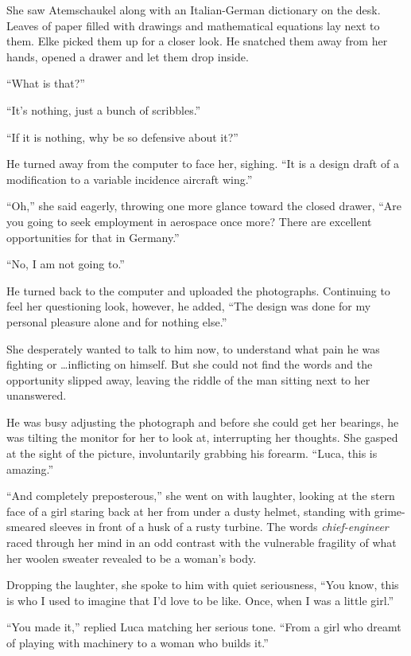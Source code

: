 She saw Atemschaukel along with an Italian-German dictionary on the desk. Leaves of paper filled with drawings and mathematical equations lay next to them. Elke picked them up for a closer look. He snatched them away from her hands, opened a drawer and let them drop inside.

``What is that?''

``It's nothing, just a bunch of scribbles.''

``If it is nothing, why be so defensive about it?''

He turned away from the computer to face her, sighing. ``It is a design draft of a modification to a variable incidence aircraft wing.''

``Oh,'' she said eagerly, throwing one more glance toward the closed drawer, ``Are you going to seek employment in aerospace once more? There are excellent opportunities for that in Germany.''

``No, I am not going to.''

He turned back to the computer and uploaded the photographs. Continuing to feel her questioning look, however, he added, ``The design was done for my personal pleasure alone and for nothing else.''

She desperately wanted to talk to him now, to understand what pain he was fighting or \ldots inflicting on himself. But she could not find the words and the opportunity slipped away, leaving the riddle of the man sitting next to her unanswered.

He was busy adjusting the photograph and before she could get her bearings, he was tilting the monitor for her to look at, interrupting her thoughts. She gasped at the sight of the picture, involuntarily grabbing his forearm. ``Luca, this is amazing.''

``And completely preposterous,'' she went on with laughter, looking at the stern face of a girl staring back at her from under a dusty helmet, standing with grime-smeared sleeves in front of a husk of a rusty turbine. The words \emph{chief-engineer} raced through her mind in an odd contrast with the vulnerable fragility of what her woolen sweater revealed to be a woman's body.

Dropping the laughter, she spoke to him with quiet seriousness, ``You know, this is who I used to imagine that I'd love to be like. Once, when I was a little girl.''

``You made it,'' replied Luca matching her serious tone. ``From a girl who dreamt of playing with machinery to a woman who builds it.''

